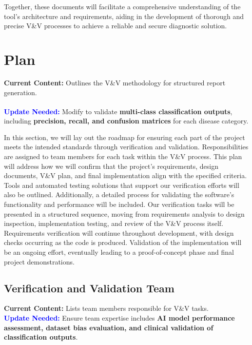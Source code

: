 \documentclass[12pt, titlepage]{article}
\begin{document}
Together, these documents will facilitate a comprehensive understanding of the tool’s architecture and requirements, aiding in the development of thorough and precise V\&V processes to achieve a reliable and secure diagnostic solution.

\section{Plan}

\textbf{Current Content:} Outlines the V\&V methodology for structured report generation. \\
\\
\textbf{\textcolor{blue}{Update Needed:}} Modify to validate \textbf{multi-class classification outputs}, including \textbf{precision, recall, and confusion matrices} for each disease category.


In this section, we will lay out the roadmap for ensuring each part of the project meets the intended standards through verification and validation. Responsibilities are assigned to team members for each task within the V\&V process. This plan will address how we will confirm that the project’s requirements, design documents, V\&V plan, and final implementation align with the specified criteria. Tools and automated testing solutions that support our verification efforts will also be outlined. Additionally, a detailed process for validating the software’s functionality and performance will be included. Our verification tasks will be presented in a structured sequence, moving from requirements analysis to design inspection, implementation testing, and review of the V\&V process itself. Requirements verification will continue throughout development, with design checks occurring as the code is produced. Validation of the implementation will be an ongoing effort, eventually leading to a proof-of-concept phase and final project demonstrations.

\subsection{Verification and Validation Team}

\textbf{Current Content:} Lists team members responsible for V\&V tasks. \\
\textbf{\textcolor{blue}{Update Needed:}} Ensure team expertise includes \textbf{AI model performance assessment, dataset bias evaluation, and clinical validation of classification outputs}.
\end{document}
